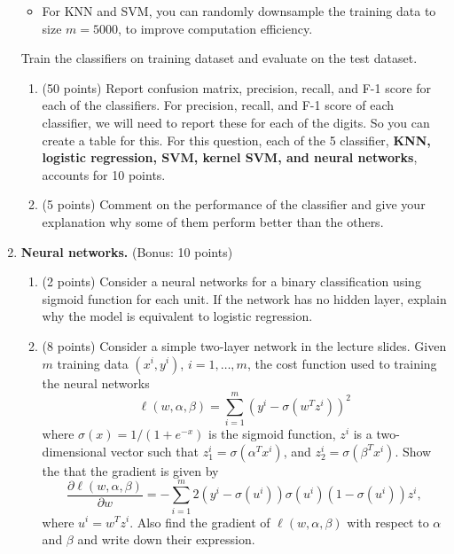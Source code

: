 \documentclass[twoside,10pt]{article}
\begin{document}
\begin{enumerate}
\begin{itemize}
\item For KNN and SVM, you can randomly downsample the training data to size $m=5000$, to improve computation efficiency. 
\end{itemize}

Train the classifiers on training dataset and evaluate on the test dataset.

\begin{enumerate}

	\item (50 points) Report confusion matrix, precision, recall, and F-1 score for each of the classifiers. For precision, recall, and F-1 score of each classifier, we will  need to report these for each of the digits. So you can create a table for this. For this question, each of the 5 classifier, {\bf KNN, logistic regression, SVM, kernel SVM, and  neural networks}, accounts for 10 points.
	\item (5 points) Comment on the performance of the classifier and give your explanation why some of them perform better than the others.	%
\end{enumerate}


\item {\bf Neural networks.} (Bonus: 10 points)

\begin{enumerate}
\item (2 points)
Consider a neural networks for a binary classification using sigmoid function for each unit. If the network has no hidden layer, explain why the model is equivalent to logistic regression. 
\item (8 points) 
Consider a simple two-layer network in the lecture slides. Given $m$ training data $(x^i, y^i)$, $i = 1, \ldots, m$, the cost function used to training the neural networks
\[
\ell(w, \alpha, \beta) = \sum_{i=1}^m (y^i - \sigma(w^T z^i))^2
\]
where $\sigma (x) = 1/(1+e^{-x})$ is the sigmoid function, $z^i$ is a two-dimensional vector such that  $z_1^i = \sigma(\alpha^T x^i)$, and $z_2^i = \sigma(\beta^T x^i)$. Show the that the gradient is given by
\[
\frac{\partial \ell(w, \alpha, \beta) }{\partial w}
= - \sum_{i=1}^m 2(y^i - \sigma(u^i))\sigma(u^i)(1-\sigma(u^i)) z^i,
\]
where $u^i = w^T z^i$. Also find the gradient of $\ell(w, \alpha, \beta)$ with respect to $\alpha$ and $\beta$ and write down their expression.
\end{enumerate}


\end{enumerate}
\end{document}
